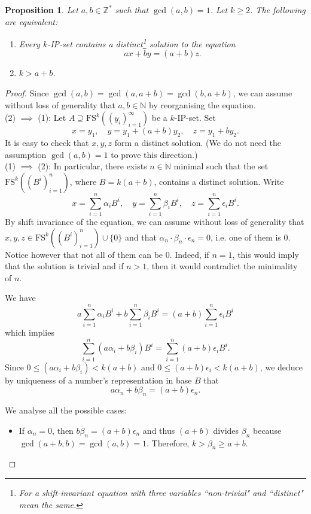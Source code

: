 \documentclass{article}
\theoremstyle{definition}
\theoremstyle{plain}
\newtheorem{proposition}[theorem]{Proposition}
\theoremstyle{remark}
\newcommand{\N}{\ensuremath{\mathbb{N}}}
\newcommand{\Z}{\ensuremath{\mathbb{Z}}}
\newcommand{\FS}[2][]{\ensuremath{\mathrm{FS}^{#1}\left(#2\right)}}
\newcommand{\seq}[2]{\ensuremath{\left ( {#1}_{#2}\right )_{#2 = 1}^\infty }}
\begin{document}
\begin{proposition}\label{shift_invariant_basecase}
   Let $a,b \in \Z^*$ such that $\gcd(a,b)= 1$. Let $k \geq 2$. The following are equivalent:
    \begin{enumerate}
        \item Every $k$-IP-set contains a distinct\footnote{For a shift-invariant equation with three variables “non-trivial" and “distinct" mean the same.} solution to the equation $$ax+ by= (a+b)z.$$
        \item $k > a+b$.
    \end{enumerate}
\end{proposition}
\begin{proof}
    Since $\gcd(a,b)= \gcd(a,a+b)= \gcd(b,a+b)$, we can assume without loss of generality that $a,b\in \N$ by reorganising the equation.\\

    (2) $\implies$ (1): Let $A \supseteq \FS[k]{\seq{y}{i}}$ be a $k$-IP-set. Set
    $$x= y_1, \quad y=y_1 + (a+b)y_2,\quad z = y_1 + b y_2.$$
    It is easy to check that $x,y,z$ form a distinct solution. (We do not need the assumption $\gcd(a,b)=1$ to prove this direction.) \\
    
    (1) $\implies$ (2): In particular, there exists $n\in \N$ minimal such that the set $\FS[k]{(B^i)_{i=1}^n}$, where $B=k(a+b)$, contains a distinct solution. Write
    $$x = \sum_{i=1}^{n} \alpha_i B^i, \quad y = \sum_{i=1}^{n} \beta_i B^i, \quad z = \sum_{i=1}^{n} \epsilon_i B^i.$$
    By shift invariance of the equation, we can assume without loss of generality that $x,y,z \in \FS[k]{(B^i)_{i=1}^n} \cup \{0\}$ and that $\alpha_{n} \cdot \beta_{n} \cdot \epsilon_{n} = 0$, i.e. one of them is 0. Notice however that not all of them can be 0. Indeed, if $n=1$, this would imply that the solution is trivial and if $n>1$, then it would contradict the minimality of $n$.
    
    We have
    $$a\sum_{i=1}^{n} \alpha_i B^i +b  \sum_{i=1}^{n} \beta_i B^i= (a+b) \sum_{i=1}^{n} \epsilon_i B^i$$
    which implies
    $$\sum_{i=1}^{n} (a \alpha_i + b \beta_i )B^i= \sum_{i=1}^{n}   (a+b) \epsilon_i B^i.$$
    Since $0 \leq (a \alpha_i + b \beta_i )  < k(a+b)$ and $0 \leq (a+b) \epsilon_i  < k(a+b)$, we deduce by uniqueness of a number's representation in base $B$ that 
    $$a \alpha_n + b \beta_n = (a+b)\epsilon_n.$$
    
    We analyse all the possible cases:
    \begin{itemize}      
        \item[-]  If $\alpha_n=0$, then $b\beta_n = (a+b)\epsilon_n$ and thus $(a+b)$ divides $\beta_n$ because $\gcd(a+b,b)= \gcd(a,b)= 1$. Therefore, $k>\beta_n \geq a+b$.
        

\end{itemize}
\end{proof}
\end{document}
